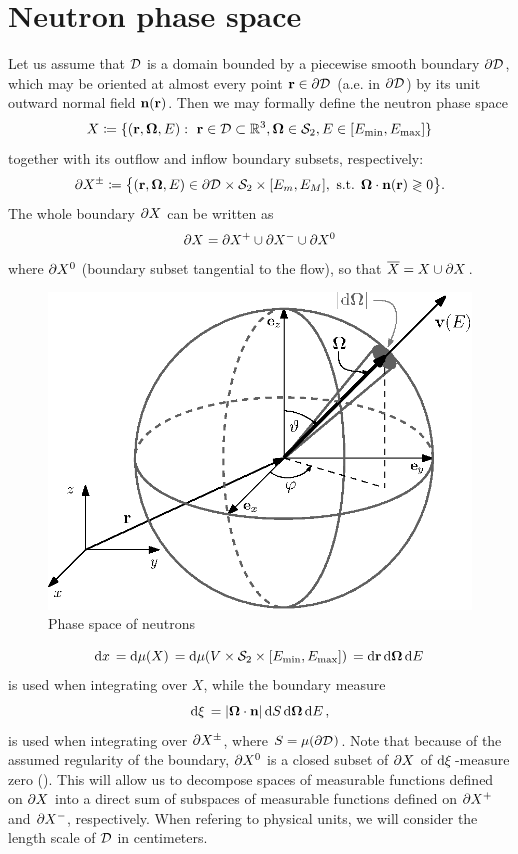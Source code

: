 \section{Neutron phase space} \label{sec:phase}
Let us assume that $\VV$ is a domain bounded by a piecewise smooth boundary $\pV$, which may be oriented at almost every
point $\br\in\pV$ (a.e. in $\pV$) by its unit outward normal field $\bn(\br)$.
Then we may formally define the neutron phase space $$
  X \coloneqq \{(\br,\bomega,E):\ \br\in \VV\subset\R[3], \bomega\in \Sphere, E \in [\Emin,\Emax]\}
$$ together with its outflow and inflow boundary subsets, respectively:
$$
  \pX[\pm] \coloneqq \bigl\{ (\br,\bomega,E) \in \pV \times \Sphere \times [E_m, E_M], \mbox{ s.t. } \bomega\cdot\bn(\br)
  \gtrless 0 \bigr\}.
$$ The whole boundary $\pX$ can be written as $$ \pX = \pX[+]\cup \pX[-] \cup \pX[0] $$ where $\pX[0]$ (boundary subset
tangential to the flow), so that $\overline X = X \cup \pX$.
\begin{figure}[!hbt]
    \centering \includegraphics[scale=1]{phase_space.eps} \caption[Phase space of neutrons]{Phase space of neutrons}
    \label{fig:phase_space}
\end{figure}%
\begin{equation}\label{eq:measure}
  \d{x} = \d{\mu(X)} = \d{\mu(V\times\Sphere\times [\Emin,\Emax])} = \d{\br}\d{\bomega}\d{E}
\end{equation}
is used when integrating over $X$, 
while the boundary measure
\begin{equation}\label{eq:measure2}
\db = \abs{\bomega\cdot\bn}\d{S}\d{\bomega}\d{E},
\end{equation}
is used when integrating over $\pX[\pm]$, where $S = \mu(\pV)$.
Note that
because of the assumed regularity of the boundary, $\pX[0]$ is a closed subset of $\pX$ of $\db$-measure zero 
(\cite[Chap. XXI, Sec. 2.2]{DautrayLions}). This will allow us to decompose spaces of measurable functions defined on 
$\pX$ into a direct sum of subspaces of measurable functions defined on $\pX[+]$ and $\pX[-]$, respectively. When 
refering to physical units, we will consider the length scale of $\VV$ in centimeters.

